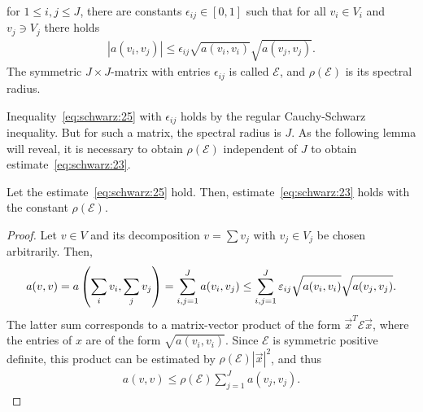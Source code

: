 \begin{assumption}
  \label{assumption:schwarz:1}
  for $1\le i,j \le J$, there are constants $\epsilon_{ij} \in [0,1]$
  such that for all $v_i \in V_i$ and $v_j \ni V_j$ there holds
  \begin{gather}
    \label{eq:schwarz:25}
    \left| a(v_i, v_j)\right|
    \le \epsilon_{ij} \sqrt{a(v_i,v_i)} \sqrt{a(v_j,v_j)}.
  \end{gather}
  The symmetric $J\times J$-matrix with entries $\epsilon_{ij}$ is called
  $\mathcal E$, and $\rho(\mathcal E)$ is its spectral radius.
\end{assumption}

\begin{note}
  Inequality~\eqref{eq:schwarz:25} with $\epsilon_{ij}$ holds by the
  regular Cauchy-Schwarz inequality. But for such a matrix, the
  spectral radius is $J$. As the following lemma will reveal, it is
  necessary to obtain $\rho(\mathcal E)$ independent of $J$ to obtain
  estimate~\eqref{eq:schwarz:23}.
\end{note}

\begin{lemma}
  \label{lemma:schwarz:7}
  Let the estimate~\eqref{eq:schwarz:25} hold. Then,
  estimate~\eqref{eq:schwarz:23} holds with the constant
  $\rho(\mathcal E)$.
\end{lemma}

\begin{proof}
  Let $v\in V$ and its decomposition $v=\sum v_j$ with $v_j\in V_j$ be
  chosen arbitrarily. Then,
  \begin{multline*}
    a(v,v)
    = a\left(\sum_i v_i, \sum_j v_j\right)
    = \sum_{i,j=1}^J a(v_i, v_j)
    \le \sum_{i,j=1}^J \epsilon_{ij} \sqrt{a(v_{\vphantom{j}i},v_i)} \sqrt{a(v_j,v_j)}.
  \end{multline*}
  The latter sum corresponds to a matrix-vector product of the form
  $\vec x^T \mathcal E \vec x$, where the entries of $x$ are of the
  form $\sqrt{a(v_i,v_i)}$. Since $\mathcal E$ is symmetric positive
  definite, this product can be estimated by $\rho(\mathcal E) |\vec
  x|^2$, and thus
  \begin{gather*}
    a(v,v) \le \rho(\mathcal E) \sum_{j=1}^J a(v_j,v_j).
  \end{gather*}
\end{proof}

